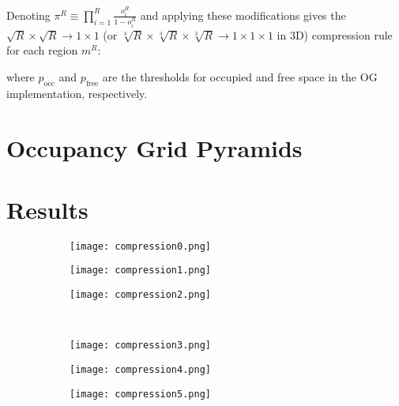 Denoting $\pi^{R} \equiv \prod_{i=1}^{R}\frac{o_{i}^{R}}{1-o_{i}^{R}}$ and applying these modifications gives the $\sqrt{R}\times\sqrt{R}\rightarrow 1\times1$ (or $\sqrt[3]{R}\times\sqrt[3]{R}\times\sqrt[3]{R}\rightarrow 1\times1\times1$ in 3D) compression rule for each region $m^{R}$:
%

where $p_{\text{occ}}$ and $p_{\text{free}}$ are the thresholds for occupied and free space in the OG implementation, respectively.

\section{Occupancy Grid Pyramids}

\section{Results}

\begin{figure}
  \centering
  \begin{subfigure}[t]{0.3\textwidth}
    \centering
    \texttt{[image: compression0.png]}
    \caption{\label{fig:}}
  \end{subfigure}
  \hfill
  \begin{subfigure}[t]{0.3\textwidth}
    \centering
    \texttt{[image: compression1.png]}
    \caption{\label{fig:}}
  \end{subfigure}
  \hfill
  \begin{subfigure}[t]{0.3\textwidth}
    \centering
    \texttt{[image: compression2.png]}
    \caption{\label{fig:}}
  \end{subfigure}
  \\
  \begin{subfigure}[t]{0.3\textwidth}
    \centering
    \texttt{[image: compression3.png]}
    \caption{\label{fig:}}
  \end{subfigure}
  \hfill
  \begin{subfigure}[t]{0.3\textwidth}
    \centering
    \texttt{[image: compression4.png]}
    \caption{\label{fig:}}
  \end{subfigure}
  \hfill
  \begin{subfigure}[t]{0.3\textwidth}
    \centering
    \texttt{[image: compression5.png]}
    \caption{\label{fig:}}
  \end{subfigure}
  \caption{\label{fig:}}
\end{figure}

